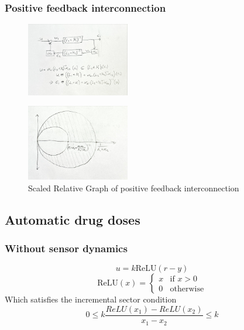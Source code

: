 \documentclass{article}
\begin{document}
\subsubsection{Positive feedback interconnection}

\begin{figure}[H]
    \centering
    \includegraphics[width=0.4\textwidth]{figures/feedback_components.jpg}
    \caption{}
\end{figure}

\begin{figure}[H]
    \centering
    \includegraphics[width=0.4\textwidth]{figures/feedback_SRG.jpg}
    \caption{Scaled Relative Graph of positive feedback interconnection}
\end{figure}

\subsection{Automatic drug doses}

\subsubsection{Without sensor dynamics}

\begin{equation}
    u = k \text{ReLU}(r - y)
\end{equation}
\begin{equation}
    \text{ReLU}(x) = \begin{cases}
        x & \text{if } x > 0 \\
        0 & \text{otherwise}
    \end{cases}
\end{equation}
Which satisfies the incremental sector condition
\begin{equation}
    0 \leq k \frac{ReLU(x_1) - ReLU(x_2)}{x_1 - x_2} \leq k
\end{equation}
\end{document}
